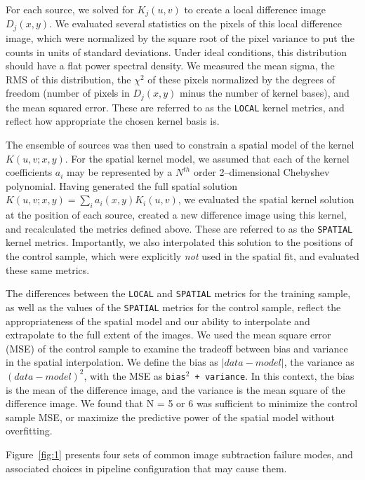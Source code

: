 \documentclass[iop]{emulateapj}
\begin{document}
For each source, we solved for $K_j(u,v)$ to create a local difference image $D_j(x,y)$.
We evaluated several statistics on the pixels of this local difference image, which were normalized by the square root of the pixel variance to put the counts in units of standard deviations.
Under ideal conditions, this distribution should have a flat power spectral density.
We measured the mean sigma, the RMS of this distribution, the $\chi^2$ of these pixels normalized by the degrees of freedom (number of pixels in $D_j(x,y)$ minus the number of kernel bases), and the mean squared error.
These are referred to as the {\tt LOCAL} kernel metrics, and reflect how appropriate the chosen kernel basis is.

The ensemble of sources was then used to constrain a spatial model of the kernel $K(u,v;x,y)$.
For the spatial kernel model, we assumed that each of the kernel coefficients $a_i$ may be represented by a $N^{th}$ order 2--dimensional Chebyshev polynomial.
Having generated the full spatial solution $K(u,v;x,y) = \sum_i a_i(x,y) K_i(u,v)$, we evaluated the spatial kernel solution at the position of each source, created a new difference image using this kernel, and recalculated the metrics defined above.
These are referred to as the {\tt SPATIAL} kernel metrics.
Importantly, we also interpolated this solution to the positions of the control sample, which were explicitly {\it not} used in the spatial fit, and evaluated these same metrics.

The differences between the {\tt LOCAL} and {\tt SPATIAL} metrics for the training sample, as well as the values of the {\tt SPATIAL} metrics for the control sample, reflect the appropriateness of the spatial model and our ability to interpolate and extrapolate to the full extent of the images.
We used the mean square error (MSE) of the control sample to examine the tradeoff between bias and variance in the spatial interpolation.
We define the bias as $\left| data - model \right|$, the variance as $(data - model)^2$, with the MSE as {\tt bias$^2$ + variance}.  
In this context, the bias is the mean of the difference image, and the variance is the mean square of the difference image.
We found that N = 5 or 6 was sufficient to minimize the control sample MSE, or maximize the predictive power of the spatial model without overfitting.

Figure~\ref{fig:1} presents four sets of common image subtraction failure modes, and associated choices in pipeline configuration that may cause them.
\end{document}
